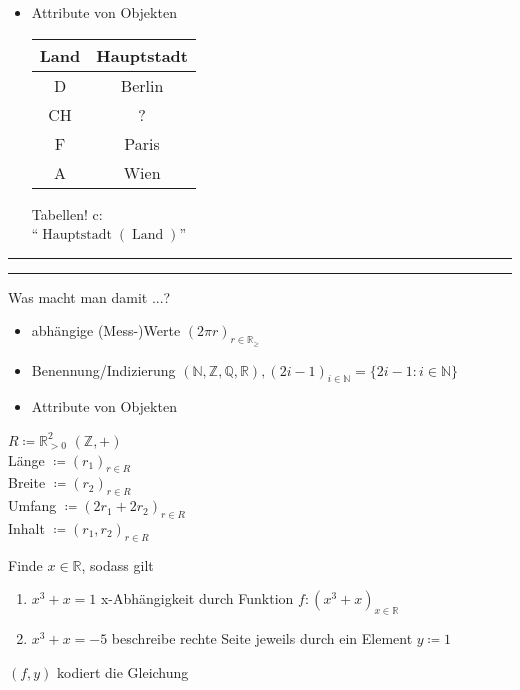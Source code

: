 \documentclass[a4paper, parskip = true, fleqn, headsepline = true]{scrartcl}
\newcommand{\N}{\mathbb{N}}
\newcommand{\Z}{\mathbb{Z}}
\newcommand{\Q}{\mathbb{Q}}
\newcommand{\R}{\mathbb{R}}
\begin{document}
\begin{itemize}
	\item Attribute von Objekten\\[1em]
		\begin{tabular}{c|c}
			Land & Hauptstadt\\
			\hline
			D	& Berlin\\
			CH	& ?\\
			F	& Paris\\
			A	& Wien\\
		\end{tabular}
		\hspace{2em}
		\begin{minipage}{0.5\textwidth}
			Tabellen! c:\\
			``$\operatorname{Hauptstadt}(\operatorname{Land})$''
		\end{minipage}
\end{itemize}

\hrule width 50pt \kern 1pt \hrule width 50pt
Was macht man damit ...?
\begin{itemize}
	\item abhängige (Mess-)Werte \qquad $ (2 \pi r )_{ r \in \R_{\geq} } $
	\item Benennung/Indizierung \qquad $ ( \N, \Z, \Q, \R ), ( 2i - 1 )_{ i \in \N } = \{ 2i - 1 : i \in \N \} $
	\item Attribute von Objekten
\end{itemize}

\hspace{2em}
\begin{minipage}{0.5\textwidth}
	$ R \coloneqq \R_{>0}^{2} $ \qquad $ ( \Z, + ) $\\
	Länge $ \coloneqq (r_1)_{r \in R} $\\
	Breite $ \coloneqq ( r_2 )_{r \in R} $\\
	Umfang $ \coloneqq ( 2r_1 + 2r_2)_{r \in R} $\\
	Inhalt $ \coloneqq ( r_1, r_2 )_{r \in R} $
\end{minipage}

\begin{example}[``Gleichungen'']
	Finde $ x \in \R $, sodass gilt
	\begin{enumerate}[label=\alph*)]
		\item $ x^3 + x = 1 $ \quad\qquad x-Abhängigkeit durch Funktion $ f : (x^3 + x )_{x \in \R} $
		\item $ x^3 + x =  -5 $ \qquad beschreibe rechte Seite jeweils durch ein Element $ y \coloneqq 1 $
	\end{enumerate}
	$ ( f, y ) $ kodiert die Gleichung
\end{example}
\end{document}
